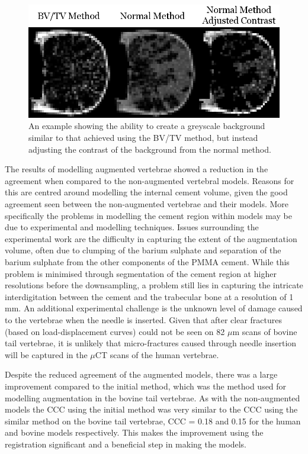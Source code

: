\begin{figure}[h!]
  \centering
\includegraphics[width=.65\textwidth]{Chapters/Chapter_HT_images/adding_contrast.png}
\caption{An example showing the ability to create a greyscale background similar to that achieved using the BV/TV method, but instead adjusting the contrast of the background from the normal method.}
	\label{fig:adding_contrast}
\end{figure}


The results of modelling augmented vertebrae showed a reduction in the
agreement when compared to the non-augmented vertebral models.  Reasons for
this are centred around modelling the internal cement volume, given the good
agreement seen between the non-augmented vertebrae and their models.  More
specifically the problems in modelling the cement region within models may be
due to experimental and modelling techniques.  Issues surrounding the
experimental work are the difficulty in capturing the extent of the
augmentation volume, often due to clumping of the barium sulphate and
separation of the barium sulphate from the other components of the PMMA cement.
While this problem is minimised through segmentation of the cement region at
higher resolutions before the downsampling, a problem still lies in capturing
the intricate interdigitation between the cement and the trabecular bone at a
resolution of 1 mm.  An additional experimental challenge is the unknown level
of damage caused to the vertebrae when the needle is inserted.  Given that
after clear fractures (based on load-displacement curves) could not be seen on
82 $\mu$m scans of bovine tail vertebrae, it is unlikely that micro-fractures
caused through needle insertion will be captured in the $\mu$CT scans of the
human vertebrae.

Despite the reduced agreement of the augmented models, there was a large
improvement compared to the initial method, which was the method used for
modelling augmentation in the bovine tail vertebrae.  As with the non-augmented
models the CCC using the initial method was very similar to the CCC using the
similar method on the bovine tail vertebrae, CCC = 0.18 and 0.15 for the human
and bovine models respectively.  This makes the improvement using the
registration significant and a beneficial step in making the models.

